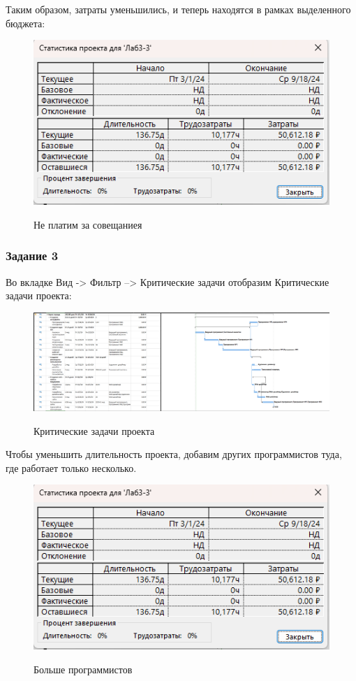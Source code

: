 Таким образом, затраты уменьшились, и теперь находятся в рамках выделенного бюджета:

\begin{figure}[ht!]
	\includegraphics[width=0.75\linewidth]{assets/images/optimize-money.png}
	\label{fig:r2}
	\caption{Не платим за совещаниея}
\end{figure}
\FloatBarrier

\subsubsection{Задание 3}

Во вкладке Вид -> Фильтр –> Критические задачи отобразим Критические задачи проекта:


\begin{figure}[ht!]
	\includegraphics[width=0.75\linewidth]{assets/images/gant-new.png}
	\label{fig:r2}
	\caption{Критические задачи проекта}
\end{figure}
\FloatBarrier

Чтобы уменьшить длительность проекта, добавим других программистов туда, где работает только несколько.

\begin{figure}[ht!]
	\includegraphics[width=0.75\linewidth]{assets/images/optimize-money.png}
	\label{fig:r2}
	\caption{Больше программистов}
\end{figure}
\FloatBarrier

